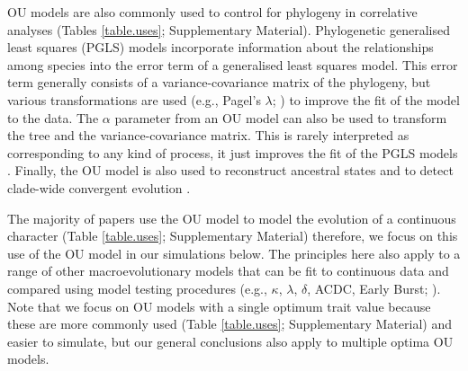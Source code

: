 \documentclass[a4paper,12pt]{article}
\begin{document}
  OU models are also commonly used to control for phylogeny in correlative analyses (Tables \ref{table.uses}; Supplementary Material).  
  Phylogenetic generalised least squares (PGLS) models incorporate information about the relationships among species into the error term of a generalised least squares model. 
  This error term generally consists of a variance-covariance matrix of the phylogeny, but various transformations are used (e.g., Pagel's $\lambda$; \citealp{Pagel:1997aa}) to improve the fit of the model to the data. 
  The $\alpha$ parameter from an OU model can also be used to transform the tree and the variance-covariance matrix.
  This is rarely interpreted as corresponding to any kind of process, it just improves the fit of the PGLS models \citep[e.g.,][]{blankers2012ecological}. Finally, the OU model is also used to reconstruct ancestral states \citep{martins1999estimation} and to detect clade-wide convergent evolution \citep{ingram2013surface}. 

  The majority of papers use the OU model to model the evolution of a continuous character (Table \ref{table.uses}; Supplementary Material) therefore, we focus on this use of the OU model in our simulations below. 
  The principles here also apply to a range of other macroevolutionary models that can be fit to continuous data and compared using model testing procedures (e.g., $\kappa$, $\lambda$, $\delta$, ACDC, Early Burst; \citealp{Pagel:1997aa,Pagel:1999aa,Blomberg:2003aa,Harmon:2008aa}).
  Note that we focus on OU models with a single optimum trait value because these are more commonly used (Table \ref{table.uses}; Supplementary Material) and easier to simulate, but our general conclusions also apply to multiple optima OU models.
\end{document}
